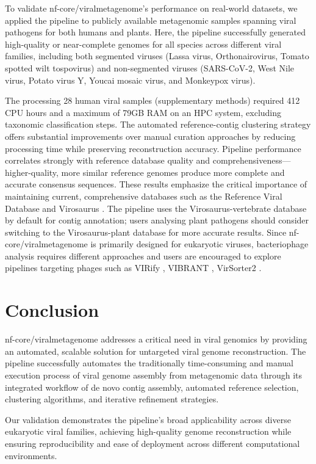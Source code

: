 To validate nf-core/viralmetagenome's performance on real-world datasets, we applied the pipeline to publicly available metagenomic samples spanning viral pathogens for both humans and plants. Here, the pipeline successfully generated high-quality or near-complete genomes for all species across different viral families, including both segmented viruses (Lassa virus, Orthonairovirus, Tomato spotted wilt tospovirus) and non-segmented viruses (SARS-CoV-2, West Nile virus, Potato virus Y, Youcai mosaic virus,  and Monkeypox virus).

The processing 28 human viral samples (supplementary methods) required 412 CPU hours and a maximum of 79GB RAM on an HPC system, excluding taxonomic classification steps. The automated reference-contig clustering strategy offers substantial improvements over manual curation approaches by reducing processing time while preserving reconstruction accuracy. Pipeline performance correlates strongly with reference database quality and comprehensiveness—higher-quality, more similar reference genomes produce more complete and accurate consensus sequences. These results emphasize the critical importance of maintaining current, comprehensive databases such as the Reference Viral Database \cite{Goodacre2018-dw} and Virosaurus \cite{Gleizes2020-rq}. The pipeline uses the Virosaurus-vertebrate database by default for contig annotation; users analysing plant pathogens should consider switching to the Virosaurus-plant database for more accurate results. Since nf-core/viralmetagenome is primarily designed for eukaryotic viruses, bacteriophage analysis requires different approaches and users are encouraged to explore pipelines targeting phages such as VIRify \cite{Rangel-Pineros2022-wv}, VIBRANT \cite{Kieft2020-aq}, VirSorter2 \cite{Guo2021-rf}.


\section{Conclusion}

nf-core/viralmetagenome addresses a critical need in viral genomics by providing an automated, scalable solution for untargeted viral genome reconstruction. The pipeline successfully automates the traditionally time-consuming and manual execution process of viral genome assembly from metagenomic data through its integrated workflow of de novo contig assembly, automated reference selection, clustering algorithms, and iterative refinement strategies.

Our validation demonstrates the pipeline's broad applicability across diverse eukaryotic viral families, achieving high-quality genome reconstruction while ensuring reproducibility and ease of deployment across different computational environments.

